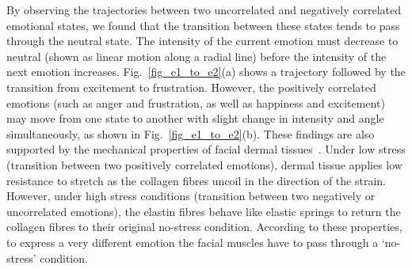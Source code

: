 \documentclass[10pt,journal,cspaper,compsoc]{IEEEtran}
\begin{document}
By observing the trajectories between two uncorrelated and negatively correlated emotional states, we found that the transition between these states tends to pass through the neutral state. The intensity of the current emotion must decrease to neutral (shown as linear motion along a radial line) before the intensity of the next emotion increases. Fig.~\ref{fig_e1_to_e2}(a) shows a trajectory followed by the transition from excitement to frustration. However, the positively correlated emotions (such as anger and frustration, as well as happiness and excitement) may move from one state to another with slight change in intensity and angle simultaneously, as shown in Fig.~\ref{fig_e1_to_e2}(b). These findings are also supported by the mechanical properties of facial dermal tissues~\cite{terzopoulos1990physically}. Under low stress (transition between two positively correlated emotions), dermal tissue applies low resistance to stretch as the collagen fibres uncoil in the direction of the strain. However, under high stress conditions (transition between two negatively or uncorrelated emotions), the elastin fibres behave like elastic springs to return the collagen fibres to their original no-stress condition. According to these properties, to express a very different emotion the facial muscles have to pass through a `no-stress' condition.
\end{document}
